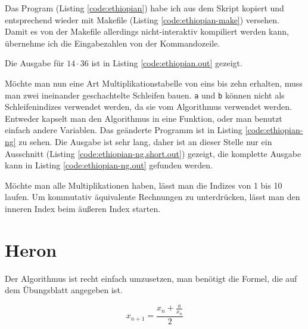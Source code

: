 Das Program (Listing \ref{code:ethiopian}) habe ich aus dem Skript kopiert und entsprechend wieder mit Makefile (Listing \ref{code:ethiopian-make}) versehen. Damit es von der Makefile allerdings nicht-interaktiv kompiliert werden kann, übernehme ich die Eingabezahlen von der Kommandozeile.



Die Ausgabe für $14 \cdot 36$ ist in Listing \ref{code:ethiopian.out} gezeigt.



Möchte man nun eine Art Multiplikationstabelle von eins bis zehn erhalten, muss man zwei ineinander geschachtelte Schleifen bauen. \texttt{a} und \texttt{b} können nicht als Schleifenindizes verwendet werden, da sie vom Algorithmus verwendet werden. Entweder kapselt man den Algorithmus in eine Funktion, oder man benutzt einfach andere Variablen. Das geänderte Programm ist in Listing \ref{code:ethiopian-ng} zu sehen. Die Ausgabe  ist sehr lang, daher ist an dieser Stelle nur ein Ausschnitt (Listing \ref{code:ethiopian-ng.short.out}) gezeigt, die komplette Ausgabe kann in Listing \ref{code:ethiopian-ng.out} gefunden werden.






Möchte man alle Multiplikationen haben, lässt man die Indizes von 1 bis 10 laufen. Um kommutativ äquivalente Rechnungen zu unterdrücken, lässt man den inneren Index beim äußeren Index starten.

\section{Heron}

Der Algorithmus ist recht einfach umzusetzen, man benötigt die Formel, die auf dem Übungsblatt angegeben ist.

\begin{equation}
x_{n+1}=\frac{x_n+\frac{a}{x_n}}{2}
\end{equation}


